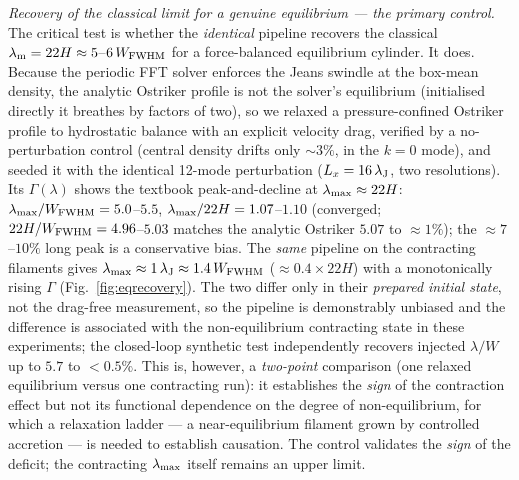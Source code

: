 \documentclass[usenatbib,twoside,twocolumn]{mnras}
\begin{document}
\emph{Recovery of the classical limit for a genuine equilibrium --- the primary control.} The critical test is whether the \emph{identical} pipeline recovers the classical $\lambda_{\rm m}=22H\approx5$--$6\,W_{\rm FWHM}$ for a force-balanced equilibrium cylinder. It does. Because the periodic FFT solver enforces the Jeans swindle at the box-mean density, the analytic Ostriker profile is not the solver's equilibrium (initialised directly it breathes by factors of two), so we relaxed a pressure-confined Ostriker profile to hydrostatic balance with an explicit velocity drag, verified by a no-perturbation control (central density drifts only $\sim3\%$, in the $k=0$ mode), and seeded it with the identical 12-mode perturbation ($L_x=16\,\lambda_{\rm J}$, two resolutions). Its $\Gamma(\lambda)$ shows the textbook peak-and-decline at $\lambda_{\rm max}\approx22H$: $\lambda_{\rm max}/W_{\rm FWHM}=5.0$--$5.5$, $\lambda_{\rm max}/22H=1.07$--$1.10$ (converged; $22H/W_{\rm FWHM}=4.96$--$5.03$ matches the analytic Ostriker $5.07$ to $\approx1\%$); the $\approx7$--$10\%$ long peak is a conservative bias. The \emph{same} pipeline on the contracting filaments gives $\lambda_{\rm max}\approx1\,\lambda_{\rm J}\approx1.4\,W_{\rm FWHM}$ ($\approx0.4\times22H$) with a monotonically rising $\Gamma$ (Fig.~\ref{fig:eqrecovery}). The two differ only in their \emph{prepared initial state}, not the drag-free measurement, so the pipeline is demonstrably unbiased and the difference is associated with the non-equilibrium contracting state in these experiments; the closed-loop synthetic test independently recovers injected $\lambda/W$ up to $5.7$ to $<0.5\%$. This is, however, a \emph{two-point} comparison (one relaxed equilibrium versus one contracting run): it establishes the \emph{sign} of the contraction effect but not its functional dependence on the degree of non-equilibrium, for which a relaxation ladder --- a near-equilibrium filament grown by controlled accretion --- is needed to establish causation. The control validates the \emph{sign} of the deficit; the contracting $\lambda_{\rm max}$ itself remains an upper limit.
\end{document}
